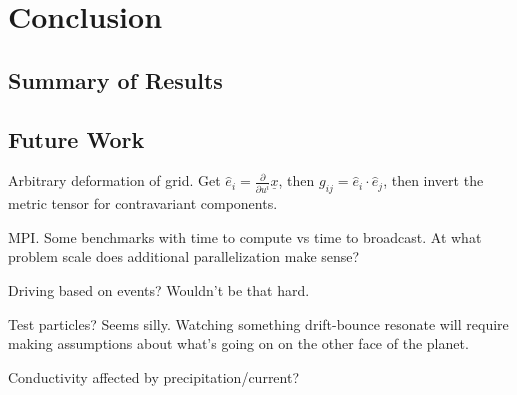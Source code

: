 
\chapter{Conclusion}
  \label{ch_conclusion}

\section{Summary of Results}


\section{Future Work}

Arbitrary deformation of grid. Get $\hat{e}_i = \frac{\partial}{\partial u^i} \underline{x}$, then $g_{ij} = \hat{e}_i \cdot \hat{e}_j$, then invert the metric tensor for contravariant components.  

MPI. Some benchmarks with time to compute vs time to broadcast. At what problem scale does additional parallelization make sense? 

Driving based on events? Wouldn't be that hard. 

Test particles? Seems silly. Watching something drift-bounce resonate will require making assumptions about what's going on on the other face of the planet.  

Conductivity affected by precipitation/current? 
